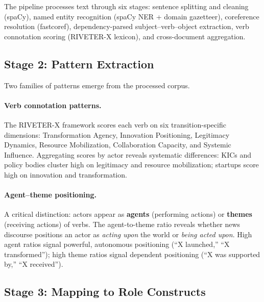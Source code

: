 \documentclass[../main.tex]{subfiles}
\begin{document}
The pipeline processes text through six stages:
sentence splitting and cleaning (spaCy),
named entity recognition (spaCy NER + domain gazetteer),
coreference resolution (fastcoref),
dependency-parsed subject--verb--object extraction,
verb connotation scoring (RIVETER-X lexicon),
and cross-document aggregation.

\subsection{Stage 2: Pattern Extraction}

Two families of patterns emerge from the processed corpus.

\paragraph{Verb connotation patterns.}
The RIVETER-X framework scores each verb on six transition-specific
dimensions: Transformation Agency, Innovation Positioning, Legitimacy
Dynamics, Resource Mobilization, Collaboration Capacity, and Systemic
Influence.
Aggregating scores by actor reveals systematic differences:
KICs and policy bodies cluster high on legitimacy and resource
mobilization; startups score high on innovation and transformation.

\paragraph{Agent--theme positioning.}
A critical distinction: actors appear as \textbf{agents} (performing
actions) or \textbf{themes} (receiving actions) of verbs.
The agent-to-theme ratio reveals whether news discourse positions
an actor as \emph{acting upon} the world or \emph{being acted upon}.
High agent ratios signal powerful, autonomous positioning
(``X launched,'' ``X transformed'');
high theme ratios signal dependent positioning
(``X was supported by,'' ``X received'').

\subsection{Stage 3: Mapping to Role Constructs}
\end{document}
